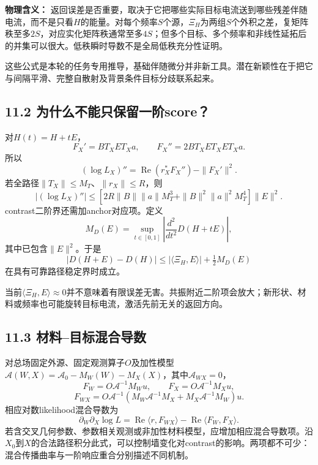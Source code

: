 \documentclass[
  10pt,
  a4paper,
]{article}
\begin{document}
\textbf{物理含义：}
返回误差是否重要，取决于它把哪些实际目标电流送到哪些残差伴随电流，而不是只看\(H\)的能量。对每个频率\(S\)个源，\(\Xi_H\)为两组\(S\)个外积之差，复矩阵秩至多\(2S\)，对应实化矩阵秩通常至多\(4S\)；但多个目标、多个频率和非线性延拓后的并集可以很大。低秩瞬时导数不是全局低秩充分性证明。

这些公式是本轮的任务专用推导，基础伴随微分并非新工具。潜在新颖性在于把它与间隔平滑、完整自散射及背景条件目标分歧联系起来。

\hypertarget{ux4e3aux4ec0ux4e48ux4e0dux80fdux53eaux4fddux7559ux4e00ux9636score}{%
\subsection{11.2
为什么不能只保留一阶score？}\label{ux4e3aux4ec0ux4e48ux4e0dux80fdux53eaux4fddux7559ux4e00ux9636score}}

对\(H(t)=H+tE\)， \[
F_X'=BT_XET_Xa,\qquad
F_X''=2BT_XET_XET_Xa.
\] 所以 \[
(\log L_X)''
=\operatorname{Re}(r_X^*F_X'')-\|F_X'\|^2.
\] 若全路径\(\|T_X\|\le M_T\)、\(\|r_X\|\le R\)，则 \[
|(\log L_X)''|
\le
\left[
2R\|B\|\|a\|M_T^3+
\|B\|^2\|a\|^2M_T^4
\right]\|E\|^2.
\] contrast二阶界还需加anchor对应项。定义 \[
M_D(E)=\sup_{t\in[0,1]}\left|\frac{d^2}{dt^2}D(H+tE)\right|,
\] 其中已包含\(\|E\|^2\)。于是 \[
|D(H+E)-D(H)|
\le|\langle\Xi_H,E\rangle|+\tfrac12M_D(E)
\] 在具有可靠路径稳定界时成立。

当前\(\langle\Xi_H,E\rangle\approx0\)并不意味着有限误差无害。共振附近二阶项会放大；新形状、材料或频率也可能旋转目标电流，激活先前无关的返回方向。

\hypertarget{ux6750ux6599ux76eeux6807ux6df7ux5408ux5bfcux6570}{%
\subsection{11.3
材料--目标混合导数}\label{ux6750ux6599ux76eeux6807ux6df7ux5408ux5bfcux6570}}

对总场固定外源、固定观测算子\(O\)及加性模型\(\mathcal A(W,X)=\mathcal A_0-M_W(W)-M_X(X)\)，其中\(\mathcal A_{WX}=0\)，
\[
F_W=O\mathcal A^{-1}M_Wu,\qquad
F_X=O\mathcal A^{-1}M_Xu,
\] \[
F_{WX}=O\mathcal A^{-1}
(M_W\mathcal A^{-1}M_X+
M_X\mathcal A^{-1}M_W)u.
\] 相应对数likelihood混合导数为 \[
\boxed{
\partial_W\partial_X\log L
=
\operatorname{Re}\langle r,F_{WX}\rangle
-\operatorname{Re}\langle F_W,F_X\rangle.
}
\]
若含交叉几何参数、参数相关观测或非加性材料模型，应增加相应混合导数项。沿\(X_0\)到\(X\)的合法路径积分此式，可以控制墙变化对contrast的影响。两项都不可少：混合传播曲率与一阶响应重合分别描述不同机制。
\end{document}
